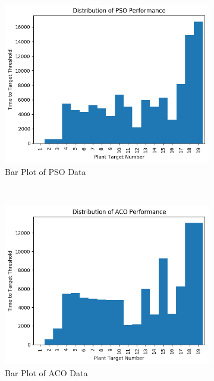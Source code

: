 \documentclass{report}
\begin{document}
\begin{figure}[H]
	\begin{subfigure}[h]{0.4\textwidth}
		\centering
		\includegraphics[width=\textwidth]{images/pso_bar}
		\caption{Bar Plot of PSO Data}
		\label{fig:psobar}
	\end{subfigure}
	~
	\begin{subfigure}[h]{0.4\textwidth}
		\centering
		\includegraphics[width=\textwidth]{images/aco_bar}
		\caption{Bar Plot of ACO Data}
		\label{fig:acobar}
	\end{subfigure}
	~
	\begin{subfigure}[h]{0.4\textwidth}
		\centering

\end{subfigure}
\end{figure}
\end{document}
